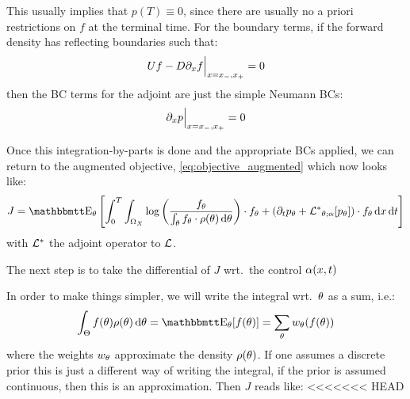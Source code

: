 \documentclass{article}
\begin{document}
This usually implies that $p(T) \equiv 0$, since there are usually no a priori
restrictions on $f$ at the terminal time. For the boundary terms, 
if the forward density has reflecting boundaries such that:
$$
U f - D{\partial}_x f\Big|_{x={ x_{-} }, { x_{+} }}  = 0
$$
then the BC terms for the adjoint are just the simple Neumann BCs:
$$
{\partial}_x p \Big|_{x={ x_{-} }, { x_{+} }} = 0
$$

Once this integration-by-parts is done and the appropriate BCs applied, we
can return to the augmented objective, \cref{eq:objective_augmented} which now
looks like:
\begin{equation}
J =  \Exp_\th
\left[ \int_0^T\int_{\O_X} \log\left(\frac{f_\th}
 					{\int_\th f_\th \cdot \rho(\th)\intd{\th}}\right) 
 			 \cdot f_\th 
 			 + 
 			 (\di_t p_\th + \Lstar_{\th;\a}[p_\th] ) \cdot f_\th
\intd{x}
\intd{t} \right]
\label{eq:objective_augmented_adjoined}
\end{equation}
with ${ { \mathcal{L} }^* }$ the adjoint operator to ${ \mathcal{L} }$.

The next step is to take the differential of $J$ wrt.\ the control
${\alpha}(x,t)$


In order to make things simpler, we will write the integral wrt.\
${\theta}$ as a sum, i.e.:
$$
\int_\Theta f(\th) \rho(\th) \intd{\th} = \Exp_\th [f(\th) ] = 
\sum_\th w_\th (f(\th))
$$ where the weights $w_{\theta}$ approximate the density $\rho({\theta})$.
If one assumes a discrete prior this is just a different way of writing the
integral, if the prior is assumed continuous, then this is an approximation.
Then $J$ reads like:
<<<<<<< HEAD
\end{document}
